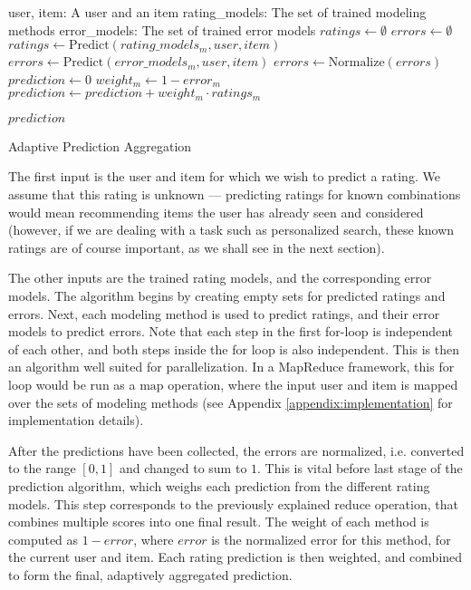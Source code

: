 \begin{algorithm}
  \begin{algorithmic}[1]
  \REQUIRE user, item: A user and an item
  \REQUIRE rating\_models: The set of trained modeling methods 
  \REQUIRE error\_models: The set of trained error models
  \ENSURE
    \STATE $ratings \gets \emptyset$
    \STATE $errors  \gets \emptyset$
      \STATE $ratings \gets \mathrm{Predict}(rating\_models_m, user, item)$
      \STATE $errors  \gets \mathrm{Predict}(error\_models_m, user, item)$
    \ENDFOR 
    \STATE $errors \gets \mathrm{Normalize}(errors)$
    \STATE $prediction \gets 0$
      \STATE $weight_m \gets 1 - error_m$
      \STATE $prediction \gets prediction + weight_m \cdot ratings_m$
    \ENDFOR
 
  \RETURN $prediction$
  \end{algorithmic}
  \caption[Adaptive Prediction Aggregation]{Adaptive Prediction Aggregation
  }
  \label{code:prediction}
\end{algorithm}

The first input is the user and item for which we wish to predict a rating.
We assume that this rating is unknown --- predicting ratings for known combinations
would mean recommending items the user has already seen and considered
(however, if we are dealing with a task such as personalized search,
these known ratings are of course important, as we shall see in the next section).

The other inputs are the trained rating models, and the corresponding error models.
The algorithm begins by creating empty sets for predicted ratings and errors.
Next, each modeling method is used to predict ratings, and their error models to predict errors.
Note that each step in the first for-loop is independent of each other, and both steps
inside the for loop is also independent. This is then an algorithm well suited for
parallelization.
In a MapReduce framework, this for loop would be run as a $\mathrm{map}$ operation,
where the input user and item is mapped over the sets of modeling methods
(see Appendix \ref{appendix:implementation} for implementation details).

After the predictions have been collected, the errors are normalized,
i.e. converted to the range $[0,1]$ and changed to sum to $1$.
This is vital before last stage of the prediction algorithm,
which weighs each prediction from the different rating models.
This step corresponds to the previously explained $\mathrm{reduce}$ operation,
that combines multiple scores into one final result.
The weight of each method is computed as $1 - error$, where $error$ 
is the normalized error for this method, for the current user and item.
Each rating prediction is then weighted, and combined to form the final,
adaptively aggregated prediction.

